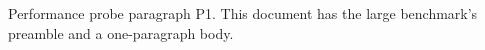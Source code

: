 \documentclass[11pt]{article}
\begin{document}
Performance probe paragraph P1. This document has the large benchmark's
preamble and a one-paragraph body.
\end{document}
